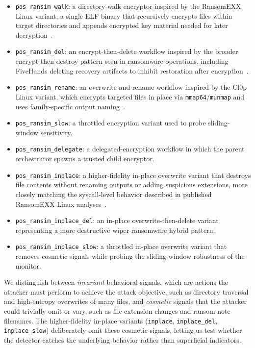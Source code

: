 \documentclass[twocolumn, 10pt]{scrartcl}
\begin{document}
\begin{itemize}
    \item \texttt{pos\_ransim\_walk}: a directory-walk encryptor inspired by the RansomEXX Linux variant, a single ELF binary that recursively encrypts files within target directories and appends encrypted key material needed for later decryption~\cite{kaspersky_ransomexx,profero_ransomexx}.
    \item \texttt{pos\_ransim\_del}: an encrypt-then-delete workflow inspired by the broader encrypt-then-destroy pattern seen in ransomware operations, including FiveHands deleting recovery artifacts to inhibit restoration after encryption~\cite{cisa_fivehands}.
    \item \texttt{pos\_ransim\_rename}: an overwrite-and-rename workflow inspired by the Cl0p Linux variant, which encrypts targeted files in place via \texttt{mmap64}/\texttt{munmap} and uses family-specific output naming~\cite{sentinelone_cl0p}.
    \item \texttt{pos\_ransim\_slow}: a throttled encryption variant used to probe sliding-window sensitivity.
    \item \texttt{pos\_ransim\_delegate}: a delegated-encryption workflow in which the parent orchestrator spawns a trusted child encryptor.
    \item \texttt{pos\_ransim\_inplace}: a higher-fidelity in-place overwrite variant that destroys file contents without renaming outputs or adding suspicious extensions, more closely matching the syscall-level behavior described in published RansomEXX Linux analyses~\cite{profero_ransomexx}.
    \item \texttt{pos\_ransim\_inplace\_del}: an in-place overwrite-then-delete variant representing a more destructive wiper-ransomware hybrid pattern.
    \item \texttt{pos\_ransim\_inplace\_slow}: a throttled in-place overwrite variant that removes cosmetic signals while probing the sliding-window robustness of the monitor.
\end{itemize}

We distinguish between \emph{invariant} behavioral signals, which are actions the attacker must perform to achieve the attack objective, such as directory traversal and high-entropy overwrites of many files, and \emph{cosmetic} signals that the attacker could trivially omit or vary, such as file-extension changes and ransom-note filenames. The higher-fidelity in-place variants (\texttt{inplace}, \texttt{inplace\_del}, \texttt{inplace\_slow}) deliberately omit these cosmetic signals, letting us test whether the detector catches the underlying behavior rather than superficial indicators.
\end{document}
